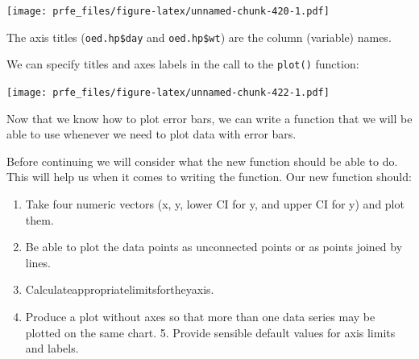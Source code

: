 \documentclass[12pt,a4paper]{book}
\newenvironment{Shaded}{\begin{snugshade}}{\end{snugshade}}
\newcommand{\DataTypeTok}[1]{\textcolor[rgb]{0.13,0.29,0.53}{#1}}
\newcommand{\DecValTok}[1]{\textcolor[rgb]{0.00,0.00,0.81}{#1}}
\newcommand{\FloatTok}[1]{\textcolor[rgb]{0.00,0.00,0.81}{#1}}
\newcommand{\KeywordTok}[1]{\textcolor[rgb]{0.13,0.29,0.53}{\textbf{#1}}}
\newcommand{\NormalTok}[1]{#1}
\newcommand{\OperatorTok}[1]{\textcolor[rgb]{0.81,0.36,0.00}{\textbf{#1}}}
\newcommand{\StringTok}[1]{\textcolor[rgb]{0.31,0.60,0.02}{#1}}
\theoremstyle{definition}
\theoremstyle{definition}
\theoremstyle{definition}
\theoremstyle{remark}
\begin{document}
\texttt{[image: prfe\_files/figure-latex/unnamed-chunk-420-1.pdf]}

The axis titles (\texttt{oed.hp\$day} and \texttt{oed.hp\$wt}) are the
column (variable) names.

We can specify titles and axes labels in the call to the \texttt{plot()}
function:

\begin{Shaded}
\end{Shaded}

\texttt{[image: prfe\_files/figure-latex/unnamed-chunk-422-1.pdf]}

Now that we know how to plot error bars, we can write a function that we
will be able to use whenever we need to plot data with error bars.

Before continuing we will consider what the new function should be able
to do. This will help us when it comes to writing the function. Our new
function should:

\begin{enumerate}
\def\labelenumi{\arabic{enumi}.}
\item
  Take four numeric vectors (x, y, lower CI for y, and upper CI for y)
  and plot them.
\item
  Be able to plot the data points as unconnected points or as points
  joined by lines.
\item
  Calculateappropriatelimitsfortheyaxis.
\item
  Produce a plot without axes so that more than one data series may be
  plotted on the same chart. 5. Provide sensible default values for axis
  limits and labels.
\end{enumerate}
\end{document}
